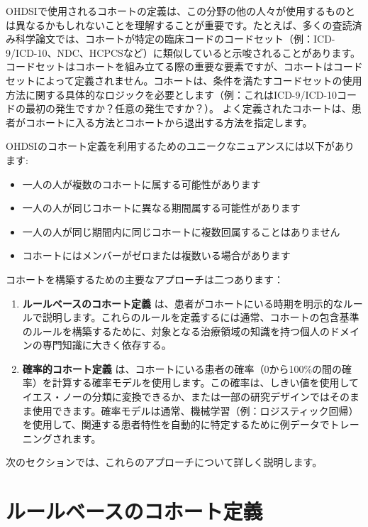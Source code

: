 \documentclass[
  11pt]{book}
\providecommand{\tightlist}{%
  \setlength{\itemsep}{0pt}\setlength{\parskip}{0pt}}
\theoremstyle{definition}
\theoremstyle{definition}
\theoremstyle{definition}
\theoremstyle{definition}
\theoremstyle{remark}
\begin{document}
  OHDSIで使用されるコホートの定義は、この分野の他の人々が使用するものとは異なるかもしれないことを理解することが重要です。たとえば、多くの査読済み科学論文では、コホートが特定の臨床コードのコードセット（例：ICD-9/ICD-10、NDC、HCPCSなど）に類似していると示唆されることがあります。コードセットはコホートを組み立てる際の重要な要素ですが、コホートはコードセットによって定義されません。コホートは、条件を満たすコードセットの使用方法に関する具体的なロジックを必要とします（例：これはICD-9/ICD-10コードの最初の発生ですか？任意の発生ですか？）。 よく定義されたコホートは、患者がコホートに入る方法とコホートから退出する方法を指定します。 

 OHDSIのコホート定義を利用するためのユニークなニュアンスには以下があります:

\begin{itemize}
\tightlist
\item
  一人の人が複数のコホートに属する可能性があります
\item
  一人の人が同じコホートに異なる期間属する可能性があります
\item
  一人の人が同じ期間内に同じコホートに複数回属することはありません
\item
  コホートにはメンバーがゼロまたは複数いる場合があります
\end{itemize}

コホートを構築するための主要なアプローチは二つあります：

\begin{enumerate}
\def\labelenumi{\arabic{enumi}.}
\item
  \textbf{ルールベースのコホート定義} は、患者がコホートにいる時期を明示的なルールで説明します。これらのルールを定義するには通常、コホートの包含基準のルールを構築するために、対象となる治療領域の知識を持つ個人のドメインの専門知識に大きく依存する。
\item
  \textbf{確率的コホート定義} は、コホートにいる患者の確率（0から100\%の間の確率）を計算する確率モデルを使用します。この確率は、しきい値を使用してイエス・ノーの分類に変換できるか、または一部の研究デザインではそのまま使用できます。確率モデルは通常、機械学習（例：ロジスティック回帰）を使用して、関連する患者特性を自動的に特定するために例データでトレーニングされます。
\end{enumerate}

次のセクションでは、これらのアプローチについて詳しく説明します。

\section{ルールベースのコホート定義}\label{ux30ebux30fcux30ebux30d9ux30fcux30b9ux306eux30b3ux30dbux30fcux30c8ux5b9aux7fa9}
\end{document}
